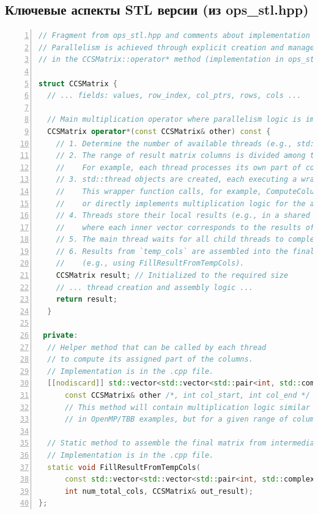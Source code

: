 \documentclass[12pt]{article}
\begin{document}
\subsection*{Ключевые аспекты STL версии (из ops\_stl.hpp)}
\begin{lstlisting}[language=C++, numbers=left, caption=Структура для параллелизма с std::thread в STL версии]
// Fragment from ops_stl.hpp and comments about implementation in .cpp
// Parallelism is achieved through explicit creation and management of std::thread
// in the CCSMatrix::operator* method (implementation in ops_stl.cpp).

struct CCSMatrix {
  // ... fields: values, row_index, col_ptrs, rows, cols ...

  // Main multiplication operator where parallelism logic is implemented.
  CCSMatrix operator*(const CCSMatrix& other) const {
    // 1. Determine the number of available threads (e.g., std::thread::hardware_concurrency()).
    // 2. The range of result matrix columns is divided among threads.
    //    For example, each thread processes its own part of columns [col_start, col_end).
    // 3. std::thread objects are created, each executing a wrapper function.
    //    This wrapper function calls, for example, ComputeColumns() for its range
    //    or directly implements multiplication logic for the assigned columns.
    // 4. Threads store their local results (e.g., in a shared vector of vectors `temp_cols`,
    //    where each inner vector corresponds to the results of one thread/column).
    // 5. The main thread waits for all child threads to complete (thread.join()).
    // 6. Results from `temp_cols` are assembled into the final matrix `result`
    //    (e.g., using FillResultFromTempCols).
    CCSMatrix result; // Initialized to the required size
    // ... thread creation and assembly logic ...
    return result;
  }

 private:
  // Helper method that can be called by each thread
  // to compute its assigned part of the columns.
  // Implementation is in the .cpp file.
  [[nodiscard]] std::vector<std::vector<std::pair<int, std::complex<double>>>> ComputeColumns(
      const CCSMatrix& other /*, int col_start, int col_end */ ) const;
      // This method will contain multiplication logic similar to that shown
      // in OpenMP/TBB examples, but for a given range of columns.

  // Static method to assemble the final matrix from intermediate results.
  // Implementation is in the .cpp file.
  static void FillResultFromTempCols(
      const std::vector<std::vector<std::pair<int, std::complex<double>>>>& temp_cols,
      int num_total_cols, CCSMatrix& out_result);
};
\end{lstlisting}
\end{document}
